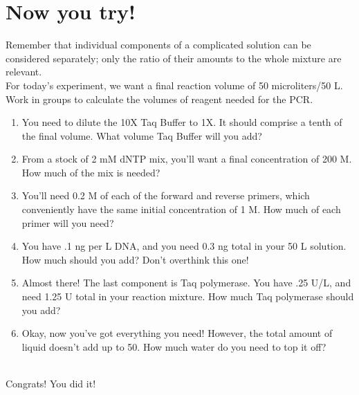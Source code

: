 \documentclass[letterpaper]{article}
\newcommand{\uL}{\micro{}L}
\begin{document}
\section*{Now you try!}
Remember that individual components of a complicated solution can be considered separately; only the ratio of their amounts to the whole mixture are relevant.\\

For today's experiment, we want a final reaction volume of 50 microliters/50 \uL{}. Work in groups to calculate the volumes of reagent needed for the PCR.

\begin{enumerate}
\item{You need to dilute the 10X Taq Buffer to 1X. It should comprise a tenth of the final volume. What volume Taq Buffer will you add?\begin{flushright}\underline{\hspace{3cm}}\end{flushright}}
\item{From a stock of 2 mM dNTP mix, you'll want a final concentration of 200 \micro{}M.\\
How much of the mix is needed?\begin{flushright}\underline{\hspace{3cm}}\end{flushright}}
\item{You'll need 0.2 \micro{}M of each of the forward and reverse primers, which conveniently have the same initial concentration of 1 \micro{}M. How much of each primer will you need?\begin{flushright}\underline{\hspace{3cm}}\end{flushright}}
\item{You have .1 ng per \uL{} DNA, and you need 0.3 ng total in your 50 \uL{} solution. How much should you add? Don't overthink this one!\begin{flushright}\underline{\hspace{3cm}}\end{flushright}}
\item{Almost there! The last component is Taq polymerase. You have .25 U/\uL{}, and need 1.25 U total in your reaction mixture. How much Taq polymerase should you add?\begin{flushright}\underline{\hspace{3cm}}\end{flushright}}
\item{Okay, now you've got everything you need! However, the total amount of liquid doesn't add up to 50. How much water do you need to top it off?\begin{flushright}\underline{\hspace{3cm}}\end{flushright}}
\end{enumerate}
\vspace{1.5in}
\begin{center}
\scalebox{5}{\Smiley{}}\\
\vspace{.3cm}
Congrats! You did it!
\end{center}
\end{document}
